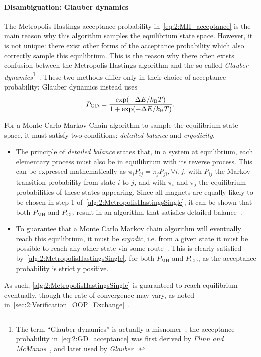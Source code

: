 \paragraph{Disambiguation: Glauber dynamics}
The Metropolis-Hastings acceptance probability in~\cref{eq:2:MH_acceptance} is the main reason why this algorithm samples the equilibrium state space.
However, it is not unique: there exist other forms of the acceptance probability which also correctly sample this equilibrium.
This is the reason why there often exists confusion between the Metropolis-Hastings algorithm and the so-called \textit{Glauber dynamics}\footnote{
	The term ``Glauber dynamics'' is actually a misnomer~\cite{bit-player_MCvsGlauber}; the acceptance probability in~\cref{eq:2:GD_acceptance} was first derived by \textit{Flinn and McManus}~\cite{flinn1961TransitionProbability}, and later used by \textit{Glauber}~\cite{glauber1963time}.
}~\cite{flinn1961TransitionProbability,glauber1963time}.
These two methods differ only in their choice of acceptance probability: Glauber dynamics instead uses
\begin{equation}
	\label{eq:2:GD_acceptance}
	P_\mathrm{GD} = \frac{\exp(-\Delta E / \kBT)}{1 + \exp(-\Delta E / \kBT)} \mathrm{.}
\end{equation}

For a Monte Carlo Markov Chain algorithm to sample the equilibrium state space, it must satisfy two conditions: \textit{detailed balance} and \textit{ergodicity}.
\begin{itemize}
	\item The principle of \textit{detailed balance} states that, in a system at equilibrium, each elementary process must also be in equilibrium with its reverse process.
	This can be expressed mathematically as $\pi_i P_{ij} = \pi_j P_{ji}, \forall i,j$, with $P_{ij}$ the Markov transition probability from state $i$ to $j$, and with $\pi_i$ and $\pi_j$ the equilibrium probabilities of these states appearing.
	Since all magnets are equally likely to be chosen in step 1 of~\cref{alg:2:MetropolisHastingsSingle}, it can be shown that both $P_\mathrm{MH}$ and $P_\mathrm{GD}$ result in an algorithm that satisfies detailed balance~\cite{kyimba2006comparisonIsingAlgorithms}.
	\item To guarantee that a Monte Carlo Markov chain algorithm will eventually reach this equilibrium, it must be \textit{ergodic}, i.e. from a given state it must be possible to reach any other state via some route~\cite{kyimba2006comparisonIsingAlgorithms}.
	This is clearly satisfied by~\cref{alg:2:MetropolisHastingsSingle}, for both $P_\mathrm{MH}$ and $P_\mathrm{GD}$, as the acceptance probability is strictly positive.
\end{itemize}
As such, \cref{alg:2:MetropolisHastingsSingle} is guaranteed to reach equilibrium eventually, though the rate of convergence may vary, as noted in~\cref{sec:2:Verification_OOP_Exchange}~\cite{jang2004stochastic}. \par

